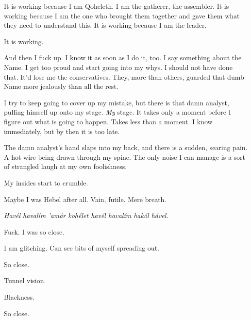 It is working because I am Qoheleth. I am the gatherer, the assembler. It is working because I am the one who brought them together and gave them what they need to understand this. It is working because I am the leader.

It is working.

And then I fuck up. I know it as soon as I do it, too. I say something about the Name. I get too proud and start going into my whys. I should not have done that. It'd lose me the conservatives. They, more than others, guarded that dumb Name more jealously than all the rest.

I try to keep going to cover up my mistake, but there is that damn analyst, pulling himself up onto my stage. \emph{My} stage. It takes only a moment before I figure out what is going to happen. Takes less than a moment. I know immediately, but by then it is too late.

The damn analyst's hand slaps into my back, and there is a sudden, searing pain. A hot wire being drawn through my spine. The only noise I can manage is a sort of strangled laugh at my own foolishness.

My insides start to crumble.

Maybe I was Hebel after all. Vain, futile. Mere breath.

\emph{Havél havalím 'amár kohélet havél havalím hakól hável.}

Fuck. I was so close.

I am glitching. Can see bits of myself spreading out.

So close.

Tunnel vision.

Blackness.

So close.
